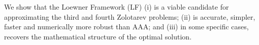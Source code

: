 We show that the Loewner Framework (LF) (i) is a viable candidate for approximating the third and fourth Zolotarev problems; (ii) is accurate, simpler, faster and numerically more robust than AAA; and (iii) in some specific cases, recovers the mathematical structure of the optimal solution.
